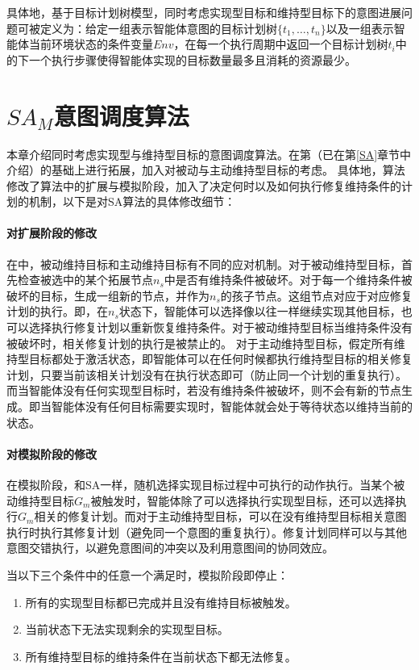 具体地，基于目标计划树模型，同时考虑实现型目标和维持型目标下的意图进展问题可被定义为：给定一组表示智能体意图的目标计划树$\{t_1, \dots, t_n\}$以及一组表示智能体当前环境状态的条件变量$Env$，在每一个执行周期中返回一个目标计划树$t_i$中的下一个执行步骤使得智能体实现的目标数量最多且消耗的资源最少。

\section{$SA_M$意图调度算法}
本章介绍同时考虑实现型与维持型目标的意图调度算法\SAM 。\SAM 在第\SA （已在第\ref{SA}章节中介绍）的基础上进行拓展，加入对被动与主动维持型目标的考虑。
具体地，\SAM 算法修改了\SA 算法中的扩展与模拟阶段，加入了决定何时以及如何执行修复维持条件的计划的机制，以下是对SA算法的具体修改细节：
\paragraph{对扩展阶段的修改}
在\SAM 中，被动维持目标和主动维持目标有不同的应对机制。对于被动维持型目标，\SAM 首先检查被选中的某个拓展节点$n_s$中是否有维持条件被破坏。对于每一个维持条件被破坏的目标，生成一组新的节点，并作为$n_s$的孩子节点。这组节点对应于对应修复计划的执行。即，在$n_s$状态下，智能体可以选择像以往一样继续实现其他目标，也可以选择执行修复计划以重新恢复维持条件。对于被动维持型目标当维持条件没有被破坏时，相关修复计划的执行是被禁止的。
对于主动维持型目标，\SAM 假定所有维持型目标都处于激活状态，即智能体可以在任何时候都执行维持型目标的相关修复计划，只要当前该相关计划没有在执行状态即可（防止同一个计划的重复执行）。
而当智能体没有任何实现型目标时，若没有维持条件被破坏，则不会有新的节点生成。即当智能体没有任何目标需要实现时，智能体就会处于等待状态以维持当前的状态。

\paragraph{对模拟阶段的修改}
在模拟阶段，\SAM 和SA一样，随机选择实现目标过程中可执行的动作执行。当某个被动维持型目标$G_m$被触发时，智能体除了可以选择执行实现型目标，还可以选择执行$G_m$相关的修复计划。而对于主动维持型目标，\SAM 可以在没有维持型目标相关意图执行时执行其修复计划（避免同一个意图的重复执行）。修复计划同样可以与其他意图交错执行，以避免意图间的冲突以及利用意图间的协同效应。

当以下三个条件中的任意一个满足时，模拟阶段即停止：
\begin{enumerate}
  \item 所有的实现型目标都已完成并且没有维持目标被触发。
  \item 当前状态下无法实现剩余的实现型目标。
  \item 所有维持型目标的维持条件在当前状态下都无法修复。
\end{enumerate}

